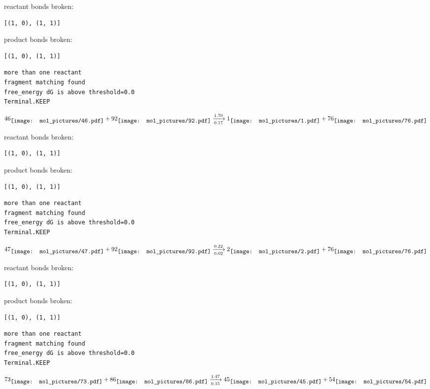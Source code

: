 \documentclass{article}
\begin{document}
reactant bonds broken:\begin{verbatim}
[(1, 0), (1, 1)]
\end{verbatim}
product bonds broken:\begin{verbatim}
[(1, 0), (1, 1)]
\end{verbatim}




\vspace{1cm}
\begin{verbatim}
more than one reactant
fragment matching found
free_energy dG is above threshold=0.0
Terminal.KEEP
\end{verbatim}
$$
46
\raisebox{-.5\height}{\texttt{[image: mol\_pictures/46.pdf]}}
+
92
\raisebox{-.5\height}{\texttt{[image: mol\_pictures/92.pdf]}}
\xrightarrow[0.17]{1.70}
1
\raisebox{-.5\height}{\texttt{[image: mol\_pictures/1.pdf]}}
+
76
\raisebox{-.5\height}{\texttt{[image: mol\_pictures/76.pdf]}}
$$


reactant bonds broken:\begin{verbatim}
[(1, 0), (1, 1)]
\end{verbatim}
product bonds broken:\begin{verbatim}
[(1, 0), (1, 1)]
\end{verbatim}




\vspace{1cm}
\begin{verbatim}
more than one reactant
fragment matching found
free_energy dG is above threshold=0.0
Terminal.KEEP
\end{verbatim}
$$
47
\raisebox{-.5\height}{\texttt{[image: mol\_pictures/47.pdf]}}
+
92
\raisebox{-.5\height}{\texttt{[image: mol\_pictures/92.pdf]}}
\xrightarrow[0.02]{0.22}
2
\raisebox{-.5\height}{\texttt{[image: mol\_pictures/2.pdf]}}
+
76
\raisebox{-.5\height}{\texttt{[image: mol\_pictures/76.pdf]}}
$$


reactant bonds broken:\begin{verbatim}
[(1, 0), (1, 1)]
\end{verbatim}
product bonds broken:\begin{verbatim}
[(1, 0), (1, 1)]
\end{verbatim}




\vspace{1cm}
\begin{verbatim}
more than one reactant
fragment matching found
free_energy dG is above threshold=0.0
Terminal.KEEP
\end{verbatim}
$$
73
\raisebox{-.5\height}{\texttt{[image: mol\_pictures/73.pdf]}}
+
86
\raisebox{-.5\height}{\texttt{[image: mol\_pictures/86.pdf]}}
\xrightarrow[0.15]{1.47}
45
\raisebox{-.5\height}{\texttt{[image: mol\_pictures/45.pdf]}}
+
54
\raisebox{-.5\height}{\texttt{[image: mol\_pictures/54.pdf]}}
$$
\end{document}
